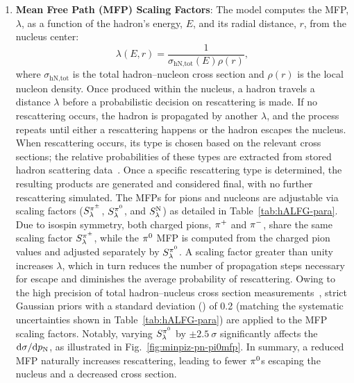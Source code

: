     \begin{enumerate}
        \item \textbf{Mean Free Path (MFP) Scaling Factors}:
        The model computes the MFP, $\lambda$, as a function of the hadron's energy, $E$, and its radial distance, $r$, from the nucleus center:
        \begin{equation}
            \lambda(E,r) = \frac{1}{\sigma_\textrm{hN,tot}(E)\rho(r)},
        \end{equation}
        where $\sigma_\textrm{hN,tot}$ is the total hadron–nucleon cross section and $\rho(r)$ is the local nucleon density. 
        Once produced within the nucleus, a hadron travels a distance $\lambda$ before a probabilistic decision on rescattering is made. 
        If no rescattering occurs, the hadron is propagated by another $\lambda$, and the process repeats until either a rescattering happens or the hadron escapes the nucleus. 
        When rescattering occurs, its type is chosen based on the relevant cross sections; the relative probabilities of these types are extracted from stored hadron scattering data~\cite{LADS:1999dyv,Navon:1983xj,Carroll:1976hj,Clough:1974qt,BAUHOFF1986429,Mashnik:2000up,Ishibashi:1997gbe}. 
        Once a specific rescattering type is determined, the resulting products are generated and considered final, with no further rescattering simulated.
        The MFPs for pions and nucleons are adjustable via scaling factors ($S_\lambda^{\pi^{\pm}}$, $S_\lambda^{\pi^{0}}$, and $S_\lambda^\textrm{N}$) as detailed in Table~\ref{tab:hALFG-para}. 
        Due to isospin symmetry, both charged pions, $\pi^+$ and $\pi^-$, share the same scaling factor $S_\lambda^{\pi^{\pm}}$, while the $\pi^0$ MFP is computed from the charged pion values and adjusted separately by $S_\lambda^{\pi^{0}}$. 
        A scaling factor greater than unity increases $\lambda$, which in turn reduces the number of propagation steps necessary for escape and diminishes the average probability of rescattering. 
        Owing to the high precision of total hadron–nucleus cross section measurements~\cite{LADS:1999dyv,Navon:1983xj,Carroll:1976hj,Clough:1974qt,BAUHOFF1986429}, strict Gaussian priors with a standard deviation (\sigma) of 0.2 (matching the systematic uncertainties shown in Table~\ref{tab:hALFG-para}) are applied to the MFP scaling factors. 
        Notably, varying $S_\lambda^{\pi^{0}}$ by $\pm2.5~\sigma$ significantly affects the \minpiz\ $\textrm{d}\sigma/\textrm{d}p_\textrm{N}$, as illustrated in Fig.~\ref{fig:minpiz-pn-pi0mfp}. 
        In summary, a reduced MFP naturally increases rescattering, leading to fewer $\pi^0$s escaping the nucleus and a decreased cross section.

\end{enumerate}
